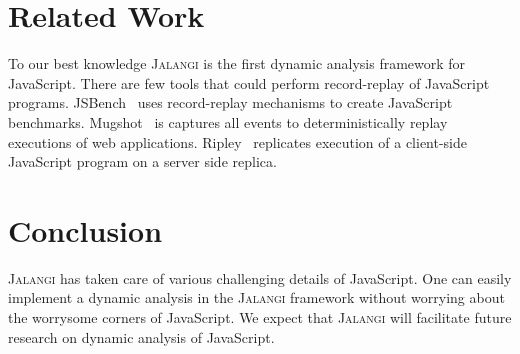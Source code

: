 \documentclass{sig-alternate}
\def\jalangi{\textsc{Jalangi}}
\begin{document}
\section{Related Work}
\label{sec:related-work}

To our best knowledge \jalangi{} is the first dynamic analysis
framework for JavaScript.  There are few tools that could perform
record-replay of JavaScript programs.
JSBench~\cite{Richards:2011:ACJ:2048066.2048119} uses record-replay
mechanisms to create JavaScript benchmarks.
Mugshot~\cite{Mickens:2010:MDC:1855711.1855722} is captures all events
to deterministically replay executions of web applications.
Ripley~\cite{Vikram:2009:RAS:1653662.1653685} replicates execution of
a client-side JavaScript program on a server side replica.


\section{Conclusion}
\label{sec:conclusion}

\jalangi{} has taken care of various challenging details of JavaScript.  One
can easily implement a dynamic analysis in the \jalangi{} framework
without worrying about the worrysome corners of JavaScript.  We expect that
\jalangi{} will facilitate future research on dynamic analysis of
JavaScript. 







{\small


}
\end{document}
